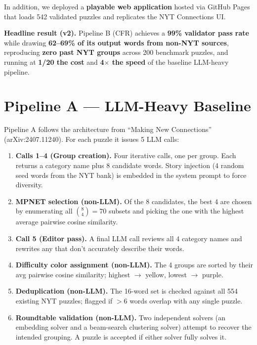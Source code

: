 \documentclass[11pt, letterpaper]{article}
\begin{document}
In addition, we deployed a \textbf{playable web application} hosted via GitHub Pages
that loads 542 validated puzzles and replicates the NYT Connections UI.

\begin{keybox}
\textbf{Headline result (v2).} Pipeline B (CFR) achieves a \textbf{99\% validator pass
rate} while drawing \textbf{62--69\% of its output words from non-NYT sources},
reproducing \textbf{zero past NYT groups} across 200 benchmark puzzles, and running at
\textbf{1/20 the cost} and \textbf{4$\times$ the speed} of the baseline LLM-heavy
pipeline.
\end{keybox}

\section{Pipeline A --- LLM-Heavy Baseline}

Pipeline A follows the architecture from ``Making New Connections'' (arXiv:2407.11240).
For each puzzle it issues 5 LLM calls:

\begin{enumerate}[leftmargin=*, itemsep=0.15em]
\item \textbf{Calls 1--4 (Group creation).} Four iterative calls, one per group. Each
returns a category name plus 8 candidate words. Story injection (4 random seed words
from the NYT bank) is embedded in the system prompt to force diversity.
\item \textbf{MPNET selection (non-LLM).} Of the 8 candidates, the best 4 are chosen
by enumerating all $\binom{8}{4}=70$ subsets and picking the one with the highest
average pairwise cosine similarity.
\item \textbf{Call 5 (Editor pass).} A final LLM call reviews all 4 category names
and rewrites any that don't accurately describe their words.
\item \textbf{Difficulty color assignment (non-LLM).} The 4 groups are sorted by
their avg pairwise cosine similarity; highest $\rightarrow$ yellow, lowest $\rightarrow$ purple.
\item \textbf{Deduplication (non-LLM).} The 16-word set is checked against all
554 existing NYT puzzles; flagged if $>\!6$ words overlap with any single puzzle.
\item \textbf{Roundtable validation (non-LLM).} Two independent solvers
(an embedding solver and a beam-search clustering solver) attempt to recover the
intended grouping. A puzzle is accepted if either solver fully solves it.
\end{enumerate}
\end{document}
